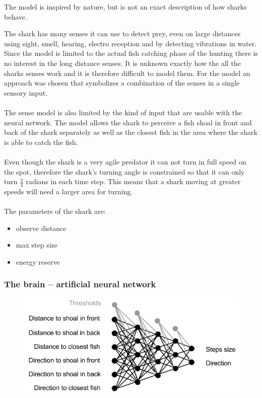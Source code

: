 The model is inspired by nature, but is not an exact description of how sharks
behave.

The shark has many senses it can use to detect prey, even on large distances
using sight, smell, hearing, electro reception and by detecting vibrations in
water\cite{shark_vision}\cite{shark_electric}. Since the model is limited
to the actual fish catching phase of the hunting there is no interest in the
long distance senses. It is unknown exactly how the all the sharks senses work and
it is therefore difficult to model them. For the model an approach was chosen
that symbolizes a combination of the senses in a single sensory input.\\
\\
The sense model is also limited by the kind of input that are usable with the
neural network. The model allows the shark to perceive a fish shoal in front
and back of the shark separately as well as the closest fish in the area where
the shark is able to catch the fish.\\
\\
Even though the shark is a very agile predator it can not turn in full speed on
the spot, therefore the shark's turning angle is constrained so that it can
only turn $\frac{\pi}{4}$ radians in each time step. This means that a shark
moving at greater speeds will need a larger area for turning.\\
\\
The parameters of the shark are:
\begin{itemize}
\item observe distance
\item max step size
\item energy reserve
\end{itemize}

\subsubsection{The brain -- artificial neural network}

\begin{figure}
\centering
\includegraphics[width=.7\textwidth]{figs/ann_structure.png}
\caption{\label{fig:ann}}
\end{figure}

